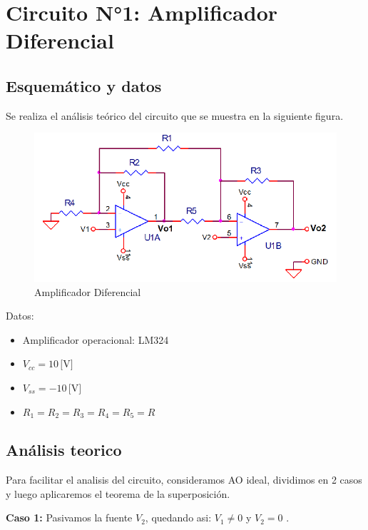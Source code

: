 \section{Circuito N°1: Amplificador Diferencial}



\subsection{Esquemático y datos}

Se realiza el análisis teórico del circuito que se muestra en la siguiente figura. 
 

\begin{figure}[h!]
    \centering
    \includegraphics[width=0.80\linewidth]{Secciones/Circuito1/esquematico.png}
    \caption{Amplificador Diferencial}
    \label{fig:esquematico}
\end{figure}

Datos:

\begin{itemize}
  \item Amplificador operacional: LM324
  \item $V_{cc} = 10 \, \text{[V]}$
  \item $V_{ss} = -10 \, \text{[V]}$
  \item $R_1 = R_2 = R_3 = R_4 = R_5 = R$
\end{itemize}

\subsection{Análisis teorico}
Para facilitar el analisis del circuito, consideramos AO ideal, dividimos en 2 casos y luego aplicaremos el teorema de la superposición.

\vspace{1em}

\textbf{Caso 1:} Pasivamos la fuente $V_2$, quedando asi: $V_1 \neq 0 $ y $V_2 = 0$ .

\vspace{1em}

